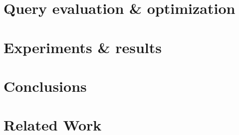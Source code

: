 \documentclass[journal]{IEEEtran} %
\begin{document}


\section{Query evaluation \& optimization}



\section{Experiments \& results}



\section{Conclusions}



\newpage
\section{Related Work}


\end{document}
